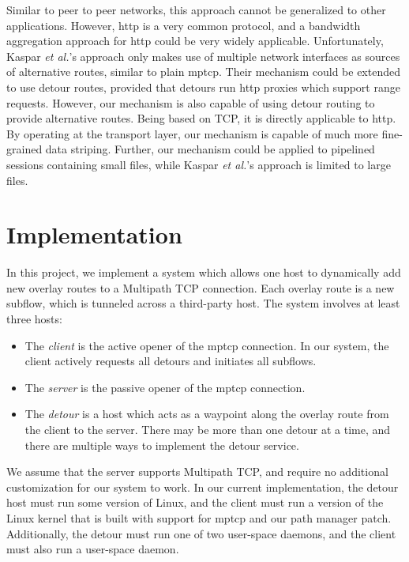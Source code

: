 \documentclass{cwru}
\begin{document}
Similar to peer to peer networks, this approach cannot be generalized to other
applications. However, \ac{http} is a very common protocol, and a bandwidth
aggregation approach for \ac{http} could be very widely applicable.
Unfortunately, Kaspar \textit{et al.}'s approach only makes use of multiple
network interfaces as sources of alternative routes, similar to plain
\ac{mptcp}. Their mechanism could be extended to use detour routes, provided
that detours run \ac{http} proxies which support range requests. However, our
mechanism is also capable of using detour routing to provide alternative routes.
Being based on TCP, it is directly applicable to \ac{http}. By operating at the
transport layer, our mechanism is capable of much more fine-grained data
striping. Further, our mechanism could be applied to pipelined sessions
containing small files, while Kaspar \textit{et al.}'s approach is limited to
large files.

\chapter{Implementation}
\label{c:impl}


In this project, we implement a system which allows one host to dynamically add
new overlay routes to a Multipath TCP connection. Each overlay route is a new
subflow, which is tunneled across a third-party host. The system involves at
least three hosts:
\begin{itemize}
\item The \emph{client} is the active opener of the \ac{mptcp} connection. In
  our system, the client actively requests all detours and initiates all
  subflows.
\item The \emph{server} is the passive opener of the \ac{mptcp} connection.
\item The \emph{detour} is a host which acts as a waypoint along the overlay
  route from the client to the server. There may be more than one detour at a
  time, and there are multiple ways to implement the detour service.
\end{itemize}

We assume that the server supports Multipath TCP, and require no additional
customization for our system to work. In our current implementation, the detour
host must run some version of Linux, and the client must run a version of the
Linux kernel that is built with support for \ac{mptcp} and our path manager
patch. Additionally, the detour must run one of two user-space daemons, and the
client must also run a user-space daemon.
\end{document}
